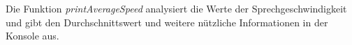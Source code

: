 Die Funktion \textit{printAverageSpeed} analysiert die Werte der Sprechgeschwindigkeit und gibt den Durchschnittswert und weitere nützliche Informationen in der Konsole aus.



